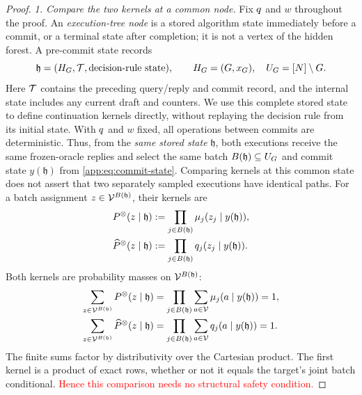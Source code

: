 \begin{proof}

\emph{1. Compare the two kernels at a common node.}
Fix $\FrozenOracle$ and $w$ throughout the proof.
\hypertarget{app-execution-tree-state}{}
An \emph{execution-tree node} is a stored algorithm state immediately before
a commit, or a terminal state after completion; it is not a vertex of the
hidden forest.  A pre-commit state records
\[
 \mathfrak h=(\History,\ScreenTranscript,\text{decision-rule state}),
 \qquad
 \History=(G,x_G),\quad
 \ResidualPositions=\PositionSet\setminus G.
\]
Here $\ScreenTranscript$ contains the preceding query/reply and commit
record, and the internal state includes any current draft and counters.
We use this complete stored state to define continuation kernels directly,
without replaying the decision rule from its initial state.
With $\FrozenOracle$ and $w$ fixed, all operations between commits are
deterministic.  Thus, from the \emph{same stored state} $\mathfrak h$, both
executions receive the same frozen-oracle replies and select the same
batch $B(\mathfrak h)\subseteq\ResidualPositions$ and commit state
$y(\mathfrak h)$ from \eqref{app:eq:commit-state}.
Comparing kernels at this common state does not assert that two separately
sampled executions have identical paths.
For a batch assignment $z\in\Vocab^{B(\mathfrak h)}$, their kernels are
\begin{align}
 \ExactBatchMass{\mathfrak h}{z}
 &:=\prod_{j\in B(\mathfrak h)}
       \ExactRowMass{y(\mathfrak h)}{j}{z_j},\notag\\
 \OracleBatchMass{\mathfrak h}{z}
 &:=\prod_{j\in B(\mathfrak h)}
       \OracleRowMass{y(\mathfrak h)}{j}{z_j}.
 \label{app:eq:exact-oracle-batch-laws}
\end{align}
Both kernels are probability masses on $\Vocab^{B(\mathfrak h)}$:
\begin{align*}
 \sum_{z\in\Vocab^{B(\mathfrak h)}}\ExactBatchMass{\mathfrak h}{z}
 &=\prod_{j\in B(\mathfrak h)}
       \sum_{a\in\Vocab}\ExactRowMass{y(\mathfrak h)}{j}{a}=1,\\
 \sum_{z\in\Vocab^{B(\mathfrak h)}}\OracleBatchMass{\mathfrak h}{z}
 &=\prod_{j\in B(\mathfrak h)}
       \sum_{a\in\Vocab}\OracleRowMass{y(\mathfrak h)}{j}{a}=1.
\end{align*}
The finite sums factor by distributivity over the Cartesian product.
The first kernel is a product of exact rows, whether or not it equals the
target's joint batch conditional.  \textcolor{red}{Hence this comparison needs
no structural safety condition.}



\end{proof}
